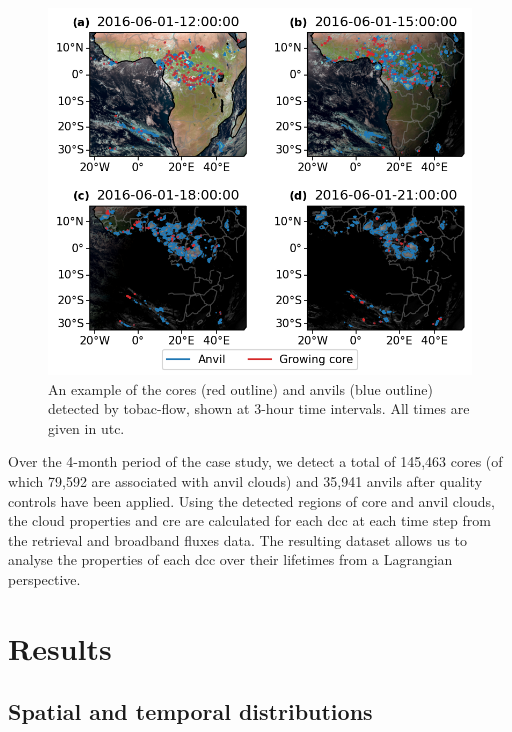\begin{figure}[tp]
    \includegraphics[width=\textwidth]{figures/ch3_04.png}
    \caption[
    An example of the cores and anvils (detected by tobac-flow, shown at 3-hour time intervals
    ]{
    An example of the cores (red outline) and anvils (blue outline) detected by tobac-flow, shown at 3-hour time intervals. All times are given in \acrshort{utc}.
    }
    \label{fig:seviri_detection}
\end{figure}


Over the 4-month period of the case study, we detect a total of 145,463
cores (of which 79,592 are associated with anvil clouds) and 35,941
anvils after quality controls have been applied. Using the detected
regions of core and anvil clouds, the cloud properties and \acrshort{cre} are
calculated for each \acrshort{dcc} at each time step from the retrieval and
broadband fluxes data. The resulting dataset allows us to analyse the
properties of each \acrshort{dcc} over their lifetimes from a Lagrangian
perspective.

\section{Results}

\subsection{Spatial and temporal distributions}

